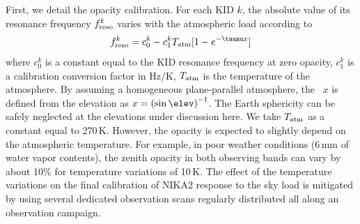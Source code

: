 First, we detail the opacity calibration. For each KID $k$, the
absolute value of its resonance frequency $f_{\rm{reso}}^k$ varies with the
atmospheric load according to
%
\begin{equation}
f_{\rm{reso}}^k  = c_0^k - c_1^k T_{\rm{atm}}[1-e^{-\taunu x}]
\label{eq:skydip}
\end{equation}
%
where $c_0^k$ is a constant equal to the KID resonance frequency at zero
opacity, $c_1^k$ is a calibration conversion factor in Hz$/$K,
$T_{\rm{atm}}$ is the temperature of the atmosphere. %
By assuming a homogeneous plane-parallel atmosphere, the
\airmass\ $x$ is defined from the elevation as
$x = \left(\sin\elev\right)^{-1}$. {\lp The Earth sphericity can be safely
neglected at the elevations under discussion here.}
We take $T_{\rm{atm}}$ as a constant equal to 270\,K. However, the opacity is
expected to slightly depend on the atmospheric temperature. For
example, in poor weather conditions (6\,mm of water vapor contents),
the zenith opacity in {\lp both observing bands} can vary by
about 10\% for temperature variations of 10\,K. The
effect of the temperature variations on the final
calibration of NIKA2 response to the sky load is mitigated by using
several dedicated observation scans regularly distributed all along an
observation campaign.

